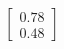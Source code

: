 \documentclass[preview]{standalone}
\begin{document}
\begin{align*}
\begin{bmatrix} 0.78 \\ 0.48 \end{bmatrix}
\end{align*}
\end{document}
